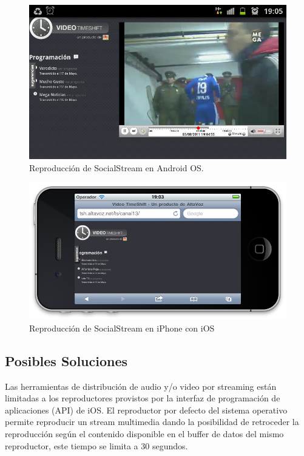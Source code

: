 \begin{figure}[h!]
	\centering
	 \includegraphics[scale=0.47]{imgs/sshot_Android_sstream.jpg}
 	\caption{Reproducción de SocialStream en Android OS.}
	\label{sshot_Android_sstream}
\end{figure}
\begin{figure}[h!]
	\centering
	\includegraphics[scale=0.55]{imgs/sshot_iOS_sstream.png}
	\caption{Reproducción de SocialStream en iPhone con iOS}
	\label{sshot_iOS_sstream}
\end{figure}

\newpage
\subsection{Posibles Soluciones}

Las herramientas de distribución de audio y/o video por streaming están limitadas a los reproductores provistos por la interfaz de programación de aplicaciones (API) de iOS. El reproductor por defecto del sistema operativo permite reproducir un stream multimedia dando la posibilidad de retroceder la reproducción según el contenido disponible en el buffer de datos del mismo reproductor, este tiempo se limita a 30 segundos.

